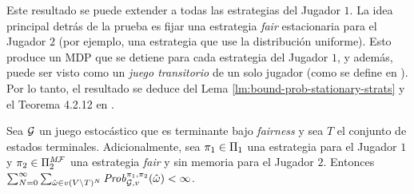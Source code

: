 Este resultado se puede extender a todas las estrategias del Jugador $1$. La idea principal detrás de la prueba es fijar una estrategia \textit{fair} estacionaria para
el Jugador $2$ (por ejemplo, una estrategia que use la distribución uniforme). Esto produce un MDP
que se detiene para cada estrategia del Jugador $1$, y además, puede ser
visto como un \emph{juego transitorio} de un solo jugador (como se define en
\cite{FilarV96}). Por lo tanto, el resultado se deduce del Lema
\ref{lm:bound-prob-stationary-strats} y el Teorema 4.2.12 en
\cite{FilarV96}.

\begin{lemma}\label{lm:games-are-bounded}
  Sea $\mathcal{G}$ un juego estocástico que es terminante bajo \textit{fairness}
  y sea $T$ el conjunto de estados terminales. Adicionalmente, sea
  $\pi_{1} \in \Pi_{1}$ una estrategia para el Jugador $1$ y
  $\pi_{2} \in \Pi^{\textit{M}\mathcal{F}}_{2}$ una estrategia \textit{fair} y sin memoria para el Jugador $2$.  Entonces
  $\sum^\infty_{N=0} \sum_{\hat{\omega} \in v(V \setminus T)^N} \mathit{Prob}^{\pi_{1}, \pi_{2}}_{\mathcal{G},v}(\hat{\omega}) < \infty$.
\end{lemma}
\iffalse
